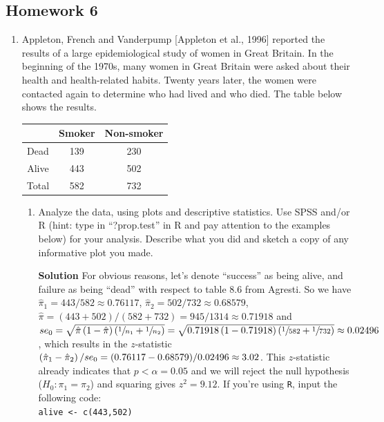 \subsection{Homework 6}
\begin{enumerate}
    \item Appleton, French and Vanderpump [Appleton et al., 1996] reported the results of a large epidemiological study of women in Great Britain. In the beginning of the 1970s, many women in Great Britain were asked about their health and health-related habits. Twenty years later, the women were contacted again to determine who had lived and who died. The table below shows the results.
    \FloatBarrier
    \begin{table}[h]
        \centering
        \begin{tabular}{c|cc}
             {} & Smoker & Non-smoker \\ \hline
             Dead & 139 & 230 \\
             Alive & 443 & 502 \\ \hline 
             Total & 582 & 732
        \end{tabular}
    \end{table}
    \FloatBarrier
    \begin{enumerate}
        \item Analyze the data, using plots and descriptive statistics. Use SPSS and/or R (hint: type in ``?prop.test'' in R and pay attention to the examples below) for your analysis. Describe what you did and sketch a copy of any informative plot you made.
        \begin{framed}{\textbf{Solution}}
        For obvious reasons, let's denote ``success'' as being alive, and failure as being ``dead'' with respect to table 8.6 from Agresti. So we have $\hat{\pi}_1 = 443/582 \approx 0.76117 $, $\hat{\pi}_2 = 502/732 \approx 0.68579 $, $\hat{\pi} = (443+502)/(582+732) = 945/1314 \approx 0.71918$ and $se_0 = \sqrt{\hat{\pi}\left( 1 - \hat{\pi}\right)\left( \sfrac{1}{n_1} + \sfrac{1}{n_2}\right)} = \sqrt{0.71918\left( 1 - 0.71918\right)\left( \sfrac{1}{582} + \sfrac{1}{732}\right)} \approx 0.02496$, which results in the $z$-statistic $\left( \hat{\pi}_1 - \hat{\pi}_2\right)/se_0 = (0.76117 - 0.68579)/0.02496 \approx 3.02$. This $z$-statistic already indicates that $p<\alpha = 0.05$ and we will reject the null hypothesis ($H_0: \pi_1 = \pi_2$) and squaring gives $z^2=9.12$. 
        If you're using \texttt{R}, input the following code:\\
        \texttt{alive <- c(443,502)} \\

\end{framed}
\end{enumerate}
\end{enumerate}
